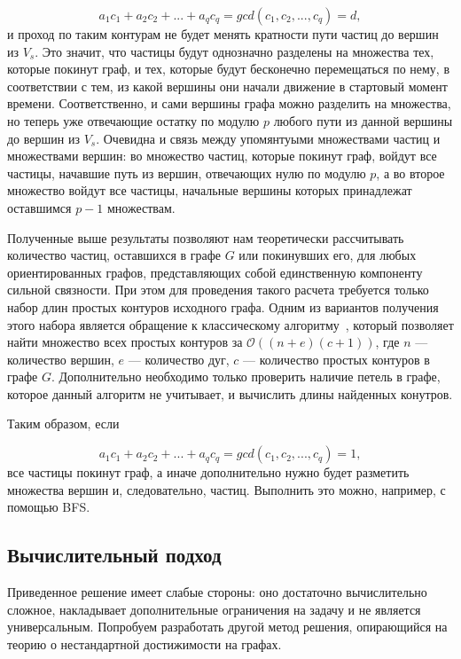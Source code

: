 	\begin{equation*}
	a_1c_1 + a_2c_2 + ... + a_qc_q = gcd(c_1, c_2, ... , c_q) = d,
	\end{equation*}	и проход по таким контурам не будет менять кратности пути частиц до вершин из $V_s$. Это значит, что частицы будут однозначно разделены на множества тех, которые покинут граф, и тех, которые будут бесконечно перемещаться по нему, в соответствии с тем, из какой вершины они начали движение в стартовый момент времени. Соответственно, и сами вершины графа можно разделить на множества, но теперь уже отвечающие остатку по модулю $p$ любого пути из данной вершины до вершин из $V_s$. Очевидна и связь между упомянтуыми множествами частиц и множествами вершин: во множество частиц, которые покинут граф, войдут все частицы, начавшие путь из вершин, отвечающих нулю по модулю $p$, а во второе множество войдут все частицы, начальные вершины которых принадлежат оставшимся $p - 1$ множествам. 
	
	Полученные выше результаты позволяют нам теоретически рассчитывать количество частиц, оставшихся в графе $G$ или покинувших его, для любых ориентированных графов, представляющих собой единственную компоненту сильной связности. При этом для проведения такого расчета требуется только набор длин простых контуров исходного графа. Одним из вариантов получения этого набора является обращение к классическому алгоритму~\autocite{Cir}, который позволяет найти множество всех простых контуров за $\mathcal{O}((n + e)(c + 1))$, где $n$ --- количество вершин, $e$ --- количество дуг, $c$ --- количество простых контуров в графе $G$. Дополнительно необходимо только проверить наличие петель в графе, которое данный алгоритм не учитывает, и вычислить длины найденных конутров. 
	
	Таким образом, если 
	
	\begin{equation*}
	a_1c_1 + a_2c_2 + ... + a_qc_q = gcd(c_1, c_2, ... , c_q) = 1,
	\end{equation*}	все частицы покинут граф, а иначе дополнительно нужно будет разметить множества вершин и, следовательно, частиц. Выполнить это можно, например, с помощью BFS.
	
	\subsection{Вычислительный подход}
	
	Приведенное решение имеет слабые стороны: оно достаточно вычислительно сложное, накладывает дополнительные ограничения на задачу и не является универсальным. Попробуем разработать другой метод решения, опирающийся на теорию о нестандартной достижимости на графах. 
	
